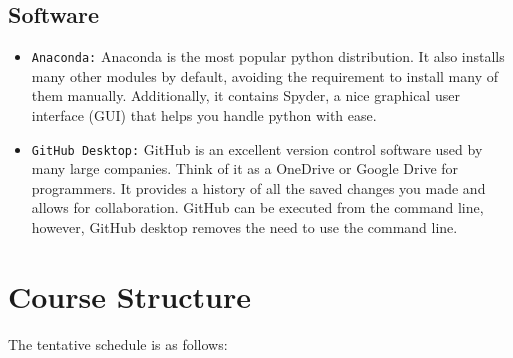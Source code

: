 \documentclass[11pt]{paper}
\begin{document}
\subsection{Software}
\begin{itemize}
\item \texttt{Anaconda:} Anaconda is the most popular python distribution. It also installs many other modules by default, avoiding the requirement to install many of them manually. Additionally, it contains Spyder, a nice graphical user interface (GUI) that helps you handle python with ease.	
\item \texttt{GitHub Desktop:} GitHub is an excellent version control software used by many large companies. Think of it as a OneDrive or Google Drive for programmers. It provides a history of all the saved changes you made and allows for collaboration. GitHub can be executed from the command line, however, GitHub desktop removes the need to use the command line.
\end{itemize}

\section{Course Structure}

The tentative schedule is as follows:   
\end{document}
